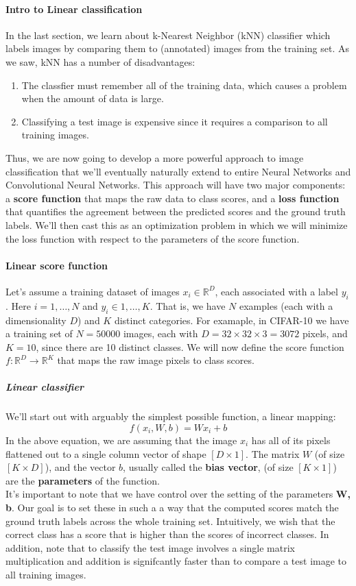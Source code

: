 \documentclass{article}
\begin{document}
\paragraph{Intro to Linear classification}
In the last section, we learn about k-Nearest Neighbor (kNN) classifier which labels images by comparing them to (annotated) images from the training set. As we saw, kNN has a number of disadvantages:
\begin{enumerate}
	\item The classfier must remember all of the training data, which causes a problem when the amount of data is large. \\
	\item Classifying a test image is expensive since it requires a comparison to all training images.
\end{enumerate}
Thus, we are now going to develop a more powerful approach to image classification that we'll eventually naturally extend to entire Neural Networks and Convolutional Neural Networks. This approach will have two major components: a \textbf{score function} that maps the raw data to class scores, and a \textbf{loss function} that quantifies the agreement between the predicted scores and the ground truth labels. We'll then cast this as an optimization problem in which we will minimize the loss function with respect to the parameters of the score function.

\paragraph{Linear score function}
Let's assume a training dataset of images $x_i \in \mathbb{R}^D$, each associated with a label $y_i$. Here $ i = 1,\ldots,N$ and $y_i \in {1,\ldots,K}$. That is, we have $N$ examples (each with a dimensionality $D$) and $K$ distinct categories. For examaple, in CIFAR-10 we have a training set of $N = 50000$ images, each with $D = 32 \times 32 \times 3 = 3072$ pixels, and $K = 10$, since there are 10 distinct classes. We will now define the score function $f: \mathbb{R}^D \rightarrow \mathbb{R}^K$ that maps the raw image pixels to class scores.
\subparagraph{Linear classifier}
We'll start out with arguably the simplest possible function, a linear mapping:
\begin{equation*}
	f(x_i,W,b) = Wx_i + b
\end{equation*}
In the above equation, we are assuming that the image $x_i$ has all of its pixels flattened out to a single column vector of shape $[D \times 1]$. The matrix $W$ (of size $[K \times D]$), and the vector $b$, usually called the \textbf{bias vector}, (of size $[K \times 1]$) are the \textbf{parameters} of the function. \\
It's important to note that we have control over the setting of the parameters \textbf{W, b}. Our goal is to set these in such a a way that the computed scores match the ground truth labels across the whole training set. Intuitively, we wish that the correct class has a score that is higher than the scores of incorrect classes. In addition, note that to classify the test image involves a single matrix multiplication and addition is signifcantly faster than to compare a test image to all training images.
\end{document}
